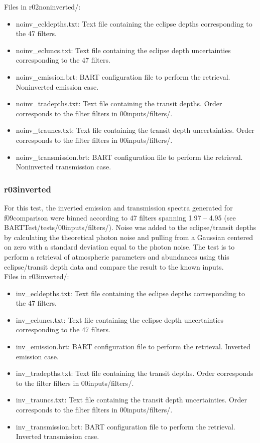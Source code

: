 \documentclass[letterpaper, 12pt]{article}
\begin{document}
Files in r02noninverted/:
\begin{itemize} \itemsep0pt
  \item noinv{\_}ecldepths.txt: Text file containing the eclipse depths corresponding to the 47 filters.
  \item noinv{\_}ecluncs.txt: Text file containing the eclipse depth 
        uncertainties corresponding to the 47 filters.
  \item noinv{\_}emission.brt: BART configuration file to perform the retrieval. 
        Noninverted emission case.
  \item noinv{\_}tradepths.txt: Text file containing the transit depths. Order 
        corresponds to the filter filters in 00inputs/filters/.
  \item noinv{\_}trauncs.txt: Text file containing the transit depth 
        uncertainties. 
        Order corresponds to the filter filters in 00inputs/filters/.
  \item noinv{\_}transmission.brt: BART configuration file to perform the 
        retrieval. Noninverted transmission case.
\end{itemize}

\subsubsection{r03inverted}
For this test, the inverted emission and transmission spectra generated for 
f09comparison were binned according to 47 filters spanning 
1.97 -- 4.95 \microns (see BARTTest/tests/00inputs/filters/). 
Noise was added to the eclipse/transit 
depths by calculating the theoretical photon noise and pulling from a Gaussian 
centered on zero with a standard deviation equal to the photon noise. The test 
is to perform a retrieval of atmospheric parameters and abundances using this 
eclipse/transit depth data and compare the result to the known inputs.\\

Files in r03inverted/:
\begin{itemize} \itemsep0pt
  \item inv{\_}ecldepths.txt: Text file containing the eclipse depths corresponding to the 47 filters.
  \item inv{\_}ecluncs.txt: Text file containing the eclipse depth uncertainties corresponding to the 47 filters.
  \item inv{\_}emission.brt: BART configuration file to perform the retrieval. 
        Inverted emission case.
  \item inv{\_}tradepths.txt: Text file containing the transit depths. Order 
        corresponds to the filter filters in 00inputs/filters/.
  \item inv{\_}trauncs.txt: Text file containing the transit depth uncertainties. 
        Order corresponds to the filter filters in 00inputs/filters/.
  \item inv{\_}transmission.brt: BART configuration file to perform the 
        retrieval. Inverted transmission case.
\end{itemize}
\end{document}
